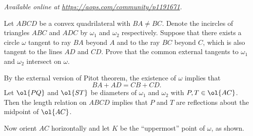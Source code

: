 
\textsl{Available online at \url{https://aops.com/community/p1191671}.}
\begin{mdframed}[style=mdpurplebox,frametitle={Problem statement}]
Let $ABCD$ be a convex quadrilateral with $BA \neq BC$.
Denote the incircles of triangles $ABC$ and $ADC$
by $\omega_1$ and $\omega_2$ respectively.
Suppose that there exists a circle $\omega$ tangent
to ray $BA$ beyond $A$ and to the ray $BC$ beyond $C$,
which is also tangent to the lines $AD$ and $CD$.
Prove that the common external tangents to
$\omega_1$ and $\omega_2$ intersect on $\omega$.
\end{mdframed}
By the external version of Pitot theorem, the existence
of $\omega$ implies that
\[ BA + AD = CB + CD. \]
Let $\ol{PQ}$ and $\ol{ST}$ be diameters of $\omega_1$ and $\omega_2$
with $P, T \in \ol{AC}$.
Then the length relation on $ABCD$ implies that $P$ and $T$
are reflections about the midpoint of $\ol{AC}$.

Now orient $AC$ horizontally and let $K$ be the ``uppermost'' point of $\omega$, as shown.

